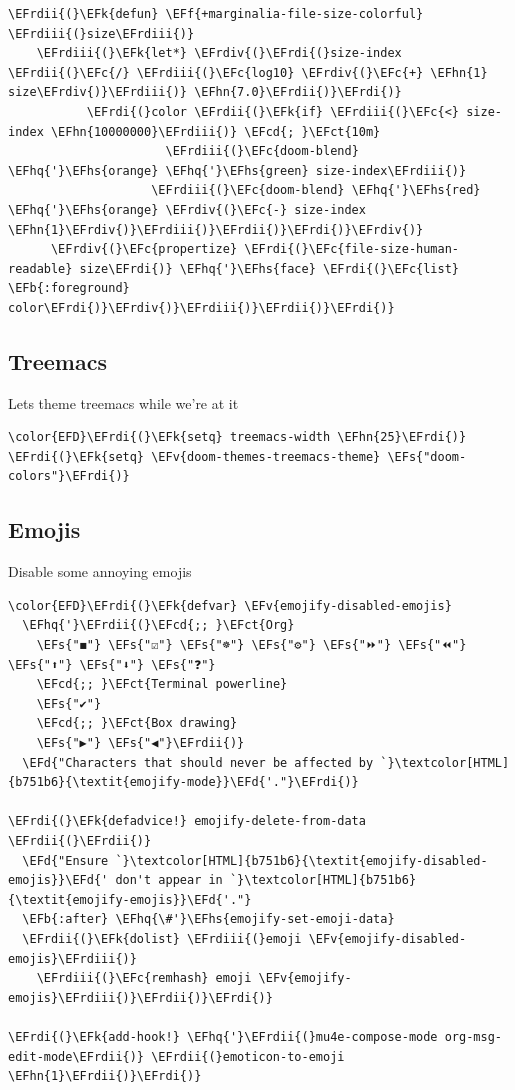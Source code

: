 \documentclass{scrartcl}
\newcommand{\EFk}[1]{\textcolor{EFk}{#1}} %
\newcommand{\EFd}[1]{\textcolor{EFd}{\textit{#1}}} %
\newcommand{\EFs}[1]{\textcolor{EFs}{#1}} %
\newcommand{\EFb}[1]{\textcolor{EFb}{#1}} %
\newcommand{\EFct}[1]{\textcolor{EFct}{#1}} %
\newcommand{\EFc}[1]{\textcolor{EFc}{#1}} %
\newcommand{\EFv}[1]{\textcolor{EFv}{#1}} %
\newcommand{\EFf}[1]{\textcolor{EFf}{#1}} %
\newcommand{\EFcd}[1]{\textcolor{EFcd}{#1}} %
\newcommand{\EFhn}[1]{\textcolor{EFhn}{\textbf{#1}}} %
\newcommand{\EFhq}[1]{\textcolor{EFhq}{#1}} %
\newcommand{\EFhs}[1]{\textcolor{EFhs}{#1}} %
\newcommand{\EFrdi}[1]{\textcolor{EFrdi}{#1}} %
\newcommand{\EFrdii}[1]{\textcolor{EFrdii}{#1}} %
\newcommand{\EFrdiii}[1]{\textcolor{EFrdiii}{#1}} %
\newcommand{\EFrdiv}[1]{\textcolor{EFrdiv}{#1}} %
\begin{document}
\begin{Code}
\begin{Verbatim}[]
  \EFrdii{(}\EFk{defun} \EFf{+marginalia-file-size-colorful} \EFrdiii{(}size\EFrdiii{)}
    \EFrdiii{(}\EFk{let*} \EFrdiv{(}\EFrdi{(}size-index \EFrdii{(}\EFc{/} \EFrdiii{(}\EFc{log10} \EFrdiv{(}\EFc{+} \EFhn{1} size\EFrdiv{)}\EFrdiii{)} \EFhn{7.0}\EFrdii{)}\EFrdi{)}
           \EFrdi{(}color \EFrdii{(}\EFk{if} \EFrdiii{(}\EFc{<} size-index \EFhn{10000000}\EFrdiii{)} \EFcd{; }\EFct{10m}
                      \EFrdiii{(}\EFc{doom-blend} \EFhq{'}\EFhs{orange} \EFhq{'}\EFhs{green} size-index\EFrdiii{)}
                    \EFrdiii{(}\EFc{doom-blend} \EFhq{'}\EFhs{red} \EFhq{'}\EFhs{orange} \EFrdiv{(}\EFc{-} size-index \EFhn{1}\EFrdiv{)}\EFrdiii{)}\EFrdii{)}\EFrdi{)}\EFrdiv{)}
      \EFrdiv{(}\EFc{propertize} \EFrdi{(}\EFc{file-size-human-readable} size\EFrdi{)} \EFhq{'}\EFhs{face} \EFrdi{(}\EFc{list} \EFb{:foreground} color\EFrdi{)}\EFrdiv{)}\EFrdiii{)}\EFrdii{)}\EFrdi{)}
\end{Verbatim}
\end{Code}

\subsection{Treemacs}
\label{sec:orgc2f2047}
Lets theme treemacs while we're at it
\begin{Code}
\begin{Verbatim}[]
\color{EFD}\EFrdi{(}\EFk{setq} treemacs-width \EFhn{25}\EFrdi{)}
\EFrdi{(}\EFk{setq} \EFv{doom-themes-treemacs-theme} \EFs{"doom-colors"}\EFrdi{)}
\end{Verbatim}
\end{Code}

\subsection{Emojis}
\label{sec:orgc9291c2}
Disable some annoying emojis
\begin{Code}
\begin{Verbatim}[]
\color{EFD}\EFrdi{(}\EFk{defvar} \EFv{emojify-disabled-emojis}
  \EFhq{'}\EFrdii{(}\EFcd{;; }\EFct{Org}
    \EFs{"◼"} \EFs{"☑"} \EFs{"☸"} \EFs{"⚙"} \EFs{"⏩"} \EFs{"⏪"} \EFs{"⬆"} \EFs{"⬇"} \EFs{"❓"}
    \EFcd{;; }\EFct{Terminal powerline}
    \EFs{"✔"}
    \EFcd{;; }\EFct{Box drawing}
    \EFs{"▶"} \EFs{"◀"}\EFrdii{)}
  \EFd{"Characters that should never be affected by `}\textcolor[HTML]{b751b6}{\textit{emojify-mode}}\EFd{'."}\EFrdi{)}

\EFrdi{(}\EFk{defadvice!} emojify-delete-from-data \EFrdii{(}\EFrdii{)}
  \EFd{"Ensure `}\textcolor[HTML]{b751b6}{\textit{emojify-disabled-emojis}}\EFd{' don't appear in `}\textcolor[HTML]{b751b6}{\textit{emojify-emojis}}\EFd{'."}
  \EFb{:after} \EFhq{\#'}\EFhs{emojify-set-emoji-data}
  \EFrdii{(}\EFk{dolist} \EFrdiii{(}emoji \EFv{emojify-disabled-emojis}\EFrdiii{)}
    \EFrdiii{(}\EFc{remhash} emoji \EFv{emojify-emojis}\EFrdiii{)}\EFrdii{)}\EFrdi{)}

\EFrdi{(}\EFk{add-hook!} \EFhq{'}\EFrdii{(}mu4e-compose-mode org-msg-edit-mode\EFrdii{)} \EFrdii{(}emoticon-to-emoji \EFhn{1}\EFrdii{)}\EFrdi{)}
\end{Verbatim}
\end{Code}
\end{document}
